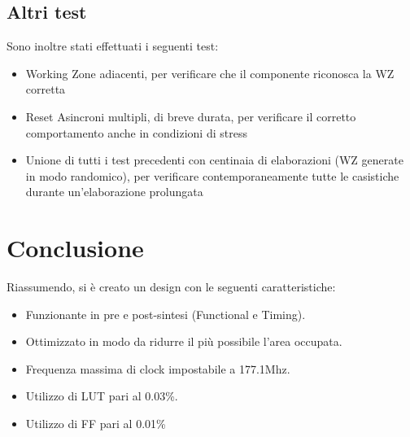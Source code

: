 \documentclass{article}
\begin{document}
\pagebreak
\subsection{Altri test}
Sono inoltre stati effettuati i seguenti test:
\begin{itemize}
\item Working Zone adiacenti, per verificare che il componente riconosca la WZ corretta
\item Reset Asincroni multipli, di breve durata, per verificare il corretto comportamento anche in condizioni di stress
\item Unione di tutti i test precedenti con centinaia di elaborazioni (WZ generate in modo randomico), per verificare contemporaneamente tutte le casistiche durante un'elaborazione prolungata
\end{itemize}

\vspace{4mm}
\titlerule[0.4pt]


\section{Conclusione}
Riassumendo, si è creato un design con le seguenti caratteristiche:
\begin{itemize}
    \item Funzionante in pre e post-sintesi (Functional e Timing).
    \item Ottimizzato in modo da ridurre il più possibile l'area occupata.
    \item Frequenza massima di clock impostabile a 177.1Mhz.
    \item Utilizzo di LUT pari al 0.03\%.
    \item Utilizzo di FF pari al 0.01\%
\end{itemize}
\end{document}
